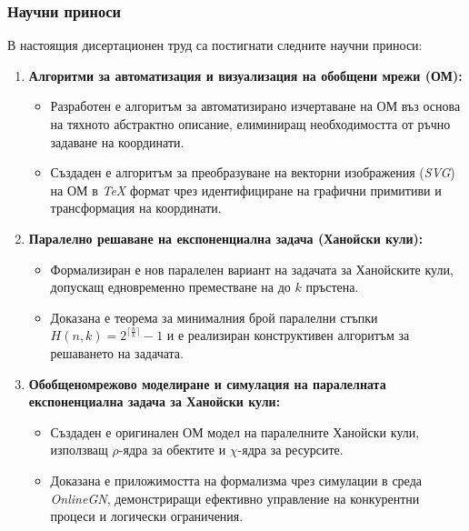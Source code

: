 \subsubsection*{Научни приноси}

В настоящия дисертационен труд са постигнати следните научни приноси:

\begin{enumerate}[label=\arabic*., leftmargin=*]
	\item \textbf{Алгоритми за автоматизация и визуализация на обобщени мрежи (ОМ):}
	\begin{itemize}
		\item Разработен е алгоритъм за автоматизирано изчертаване на ОМ въз основа на тяхното абстрактно описание, елиминиращ необходимостта от ръчно задаване на координати.
		\item Създаден е алгоритъм за преобразуване на векторни изображения (\textit{SVG}) на ОМ в \textit{TeX} формат чрез идентифициране на графични примитиви и трансформация на координати.
	\end{itemize}
	
	\item \textbf{Паралелно решаване на експоненциална задача (Ханойски кули):}
	\begin{itemize}
		\item Формализиран е нов паралелен вариант на задачата за Ханойските кули, допускащ едновременно преместване на до $k$ пръстена.
		\item Доказана е теорема за минималния брой паралелни стъпки $H(n,k) = 2^{\bigl\lceil \textstyle \frac{n}{k} \bigr\rceil} - 1$ и е реализиран конструктивен алгоритъм за решаването на задачата.
	\end{itemize}
	
	\item \textbf{Обобщеномрежово моделиране и симулация на паралелната експоненциална задача за Ханойски кули:}
	\begin{itemize}
		\item Създаден е оригинален ОМ модел на паралелните Ханойски кули, използващ $\rho$-ядра за обектите и $\chi$-ядра за ресурсите.
		\item Доказана е приложимостта на формализма чрез симулации в среда \textit{OnlineGN}, демонстриращи ефективно управление на конкурентни процеси и логически ограничения.
	\end{itemize}
\end{enumerate}

